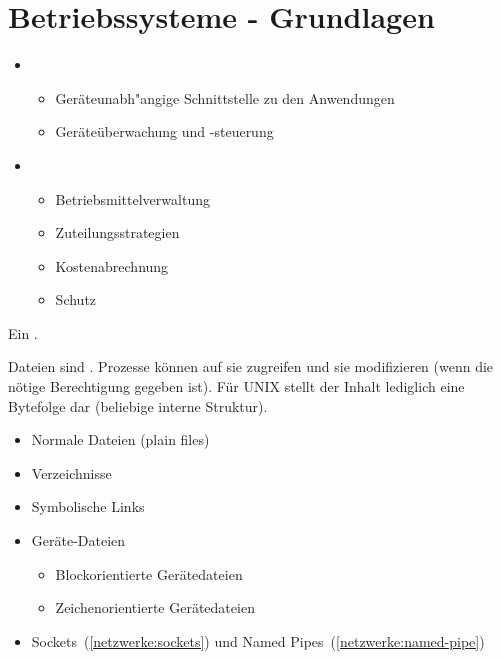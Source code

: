 \section{Betriebssysteme - Grundlagen}

\begin{answer}
  \begin{itemize}
  \item {}
    \begin{itemize}
    \item Geräteunabh"angige Schnittstelle zu den Anwendungen 
    \item Geräteüberwachung und -steuerung
    \end{itemize}
    
  \item {}
    \begin{itemize}
    \item Betriebsmittelverwaltung
    \item Zuteilungsstrategien
    \item Kostenabrechnung
    \item Schutz
    \end{itemize}
  \end{itemize}
\end{answer}

\begin{answer}
  Ein .
\end{answer}

\begin{answer}
  Dateien sind . Prozesse können auf sie zugreifen und sie modifizieren (wenn die nötige Berechtigung gegeben ist). Für UNIX stellt der Inhalt lediglich eine Bytefolge dar (beliebige interne Struktur).
\end{answer}

\begin{answer}

  \begin{itemize}
  \item Normale Dateien (plain files)
  \item Verzeichnisse
  \item Symbolische Links
  \item Geräte-Dateien
	\begin{itemize}
	\item Blockorientierte Gerätedateien
	\item Zeichenorientierte Gerätedateien
	\end{itemize}
  \item Sockets~(\ref{netzwerke:sockets}) und Named Pipes~(\ref{netzwerke:named-pipe})
  \end{itemize}

\end{answer}

